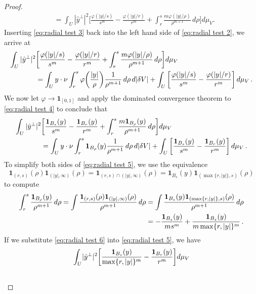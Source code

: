 \documentclass[10pt,reqno]{amsart}
\numberwithin{equation}{section}
\theoremstyle{definition}
\begin{document}
{{\begin{proof}
\begin{align}
    &= \int_U |\hat y^\perp|^2 \bigg[\frac{\varphi(|y|/s)}{s^m}-\frac{\varphi(|y|/r)}{r^m} + \int_r^s \frac{m\varphi(|y|/\rho)}{\rho^{m+1}}\,d\rho\bigg]d \mu_V.
\end{align}
Inserting \eqref{eq:radial test 3} back into the left hand side of \eqref{eq:radial test 2}, we arrive at 
\begin{align}\notag
    \int_U |\hat y^\perp|^2 &\bigg[\frac{\varphi(|y|/s)}{s^m}-\frac{\varphi(|y|/r)}{r^m} + \int_r^s \frac{m\varphi(|y|/\rho)}{\rho^{m+1}}\,d\rho\bigg]d \mu_V \\ \label{eq:radial test 4}
    &= \int_Uy \cdot \nu\int_r^s \varphi\bigg(\frac{|y|}{\rho}\bigg)\frac{1}{\rho^{m+1}}\,d\rho\, d|\delta V| + \int_U \bigg[\frac{\varphi(|y|/s)}{s^m}-\frac{\varphi(|y|/r)}{r^m}\bigg]\,d\mu_V\,.
\end{align}
We now let $\varphi \to \mathbf{1}_{[0,1]}$ and apply the dominated convergence theorem to \eqref{eq:radial test 4} to conclude that
\begin{align}\notag
    \int_U |\hat y^\perp|^2 &\bigg[\frac{\mathbf{1}_{B_s}(y)}{s^m}-\frac{\mathbf{1}_{B_r}(y)}{r^m} + \int_r^s \frac{m\mathbf{1}_{B_\rho}(y)}{\rho^{m+1}}\,d\rho\bigg]d \mu_V \\ \label{eq:radial test 5}
    &= \int_Uy \cdot \nu\int_r^s \mathbf{1}_{B_\rho}(y)\frac{1}{\rho^{m+1}}\,d\rho\, d|\delta V| + \int_U \bigg[\frac{\mathbf{1}_{B_s}(y)}{s^m}-\frac{\mathbf{1}_{B_r}(y)}{r^m}\bigg]\,d\mu_V \,.
\end{align}
To simplify both sides of \eqref{eq:radial test 5}, we use the equivalence
$$
\mathbf{1}_{(r,s)}(\rho)\mathbf{1}_{(|y|,\infty)}(\rho)=\mathbf{1}_{(r,s) \cap (|y|,\infty)}(\rho) = \mathbf{1}_{B_s}(y)\mathbf{1}_{(\max\{r,|y|\},s)}(\rho)
$$
to compute
\begin{align}\notag
  \int_r^s \frac{\mathbf{1}_{B_\rho}(y)}{\rho^{m+1}}\,d\rho = \int \frac{\mathbf{1}_{(r,s)}(\rho)\mathbf{1}_{(|y|,\infty)}(\rho)}{\rho^{m+1}}\,d\rho &= \int \frac{\mathbf{1}_{B_s}(y)\mathbf{1}_{(\max\{r,|y|\},s)}(\rho)}{\rho^{m+1}}\,d\rho \\ \label{eq:radial test 6}
  &= -\frac{\mathbf{1}_{B_s}(y)}{ms^m} + \frac{\mathbf{1}_{B_s}(y)}{m\max\{r,|y|\}^m}\,.
\end{align}
If we substitute \eqref{eq:radial test 6} into \eqref{eq:radial test 5}, we have
\begin{align}\notag
    \int_U &|\hat y^\perp|^2 \bigg[ \frac{\mathbf{1}_{B_s}(y)}{\max\{r,|y|\}^m} - \frac{\mathbf{1}_{B_r}(y)}{r^m}\bigg]d \mu_V \\ \notag

\end{align}
\end{proof}}}
\end{document}
